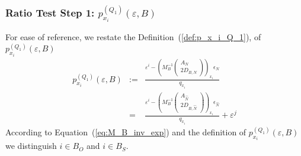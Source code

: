 \documentclass[a4paper]{article}
\begin{document}
\subsubsection{Ratio Test Step 1:
$p_{x_{i}}^{(Q_{1})}(\varepsilon, B)$}
For ease of reference, we restate the Definition~(\ref{def:p_x_i_Q_1}),
of $p_{x_{i}}^{(Q_{1})}(\varepsilon, B)$
\begin{eqnarray*}
p_{x_{i}}^{(Q_{1})}\left(\varepsilon, B\right) &:=&
  \frac{\varepsilon^{i} -
         \left(M_{B}^{-1}
           \left(\begin{array}{c}
                    A_{N}  \\
	            \hline
	            2D_{B, N}
	         \end{array}
	   \right)
         \right)_{x_{i}}\epsilon_{N}}{q_{x_{i}}}
\\
&=&
\frac{\varepsilon^{i} -
         \left(M_{B}^{-1}
           \left(\begin{array}{c}
                    A_{\hat{N}}  \\
	            \hline
	            2D_{B, \hat{N}}
	         \end{array}
	   \right)
         \right)_{x_{i}}\epsilon_{\hat{N}}}{q_{x_{i}}}
+ \varepsilon^{j}
\end{eqnarray*}
According to Equation~(\ref{eq:M_B_inv_exp}) and the definition of
$p_{x_{i}}^{(Q_{1})}(\varepsilon, B)$ we distinguish $i \in B_{O}$ and
$i \in B_{S}$.
\end{document}
